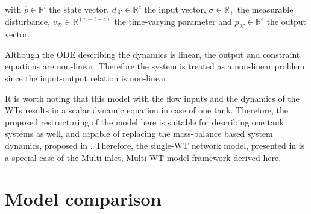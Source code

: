 with $\hat{p} \in \mathbb{R}^{l}$ the state vector, $\bar{d}_{\mathcal{K}} \in \mathbb{R}^{c}$ the input vector, $\sigma \in \mathbb{R}_{+}$ the measurable disturbance, $v_{\mathcal{D}} \in \mathbb{R}^{(n-l-c)}$ the time-varying parameter and $\bar{p}_{\mathcal{K}} \in \mathbb{R}^{c}$ the output vector. 

Although the ODE describing the dynamics is linear, the output and constraint equations are non-linear. Therefore the system is treated as a non-linear problem since the input-output relation is non-linear.  

It is worth noting that this model with the flow inputs and the dynamics of the WTs results in a scalar dynamic equation in case of one tank. Therefore, the proposed restructuring of the model here is suitable for describing one tank systems as well, and capable of replacing the mass-balance based system dynamics, proposed in . Therefore, the single-WT network model, presented in  is a special case of the Multi-inlet, Multi-WT model framework derived here. 




\newpage

\section{Model comparison}
\label{model_comparison}


